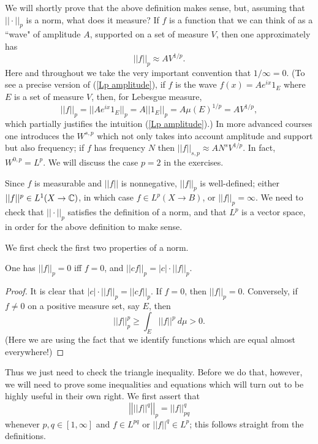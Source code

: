 We will shortly prove that the above definition makes sense, but, assuming that $||\cdot||_p$ is a norm, what does it measure?
If $f$ is a function that we can think of as a ``wave" of amplitude $A$, supported on a set of measure $V$, then one approximately has
\begin{equation}
\label{Lp amplitude}
||f||_p \approx AV^{1/p}.
\end{equation}
Here and throughout we take the very important convention that $1/\infty = 0$.
(To see a precise version of (\ref{Lp amplitude}), if $f$ is the wave $f(x) = Ae^{ix}1_E$ where $E$ is a set of measure $V$, then, for Lebesgue measure,
$$||f||_p = ||Ae^{ix}1_E||_p = A ||1_E||_p = A\mu(E)^{1/p} = AV^{1/p},$$
which partially justifies the intuition (\ref{Lp amplitude}).)
In more advanced courses one introduces the  $W^{s,p}$ which not only takes into account amplitude and support but also frequency; if $f$ has frequency $N$ then $||f||_{s,p} \approx AN^sV^{1/p}$.
In fact, $W^{0,p} = L^p$.
We will discuss the case $p = 2$ in the exercises.

Since $f$ is measurable and $||f||$ is nonnegative, $||f||_p$ is well-defined; either $||f||^p \in L^1(X \to \mathbb{C})$, in which case $f \in L^p(X \to B)$, or $||f||_p = \infty$.
We need to check that $||\cdot||_p$ satisfies the definition of a norm, and that $L^p$ is a vector space, in order for the above definition to make sense.

We first check the first two properties of a norm.
\begin{lemma}
One has $||f||_p = 0$ iff $f = 0$, and $||cf||_p = |c|\cdot||f||_p$.
\end{lemma}
\begin{proof}
It is clear that $|c|\cdot||f||_p = ||cf||_p$.
If $f = 0$, then $||f||_p = 0$.
Conversely, if $f \neq 0$ on a positive measure set, say $E$, then
$$||f||_p^p \geq \int_E ||f||^p ~d\mu > 0.$$
(Here we are using the fact that we identify functions which are equal almost everywhere!)
\end{proof}

Thus we just need to check the triangle inequality. Before we do that, however, we will need to prove some inequalities and equations which will turn out to be highly useful in their own right.
We first assert that
\begin{equation}
\label{pull exponent of Lp}
\left|\left|||f||^q\right|\right|_p = ||f||_{pq}^q
\end{equation}
whenever $p, q \in [1, \infty]$ and $f \in L^{pq}$ or $||f||^q \in L^p$; this follows straight from the definitions.

